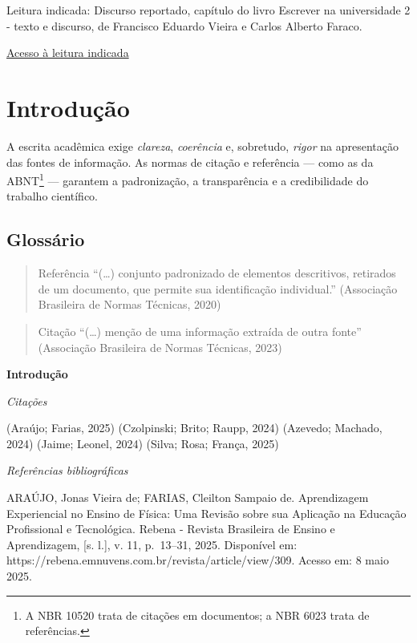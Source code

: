 \documentclass[
  letterpaper,
  DIV=11,
  numbers=noendperiod]{scrreprt}
\begin{document}
Leitura indicada: Discurso reportado, capítulo do livro Escrever na
universidade 2 - texto e discurso, de Francisco Eduardo Vieira e Carlos
Alberto Faraco.

\href{https://drive.google.com/file/d/17QvXPqtVvgArZpXv0XJhTnwTayxVkxFc/view?usp=sharing}{Acesso
à leitura indicada}

\section{Introdução}\label{introduuxe7uxe3o-3}

A escrita acadêmica exige \emph{clareza}, \emph{coerência} e, sobretudo,
\emph{rigor} na apresentação das fontes de informação. As normas de
citação e referência --- como as da ABNT\footnote{A NBR 10520 trata de
  citações em documentos; a NBR 6023 trata de referências.} --- garantem
a padronização, a transparência e a credibilidade do trabalho
científico.

\subsection{Glossário}\label{glossuxe1rio}

\begin{quote}
Referência ``(\ldots) conjunto padronizado de elementos descritivos,
retirados de um documento, que permite sua identificação individual.''
(Associação Brasileira de Normas Técnicas, 2020)
\end{quote}

\begin{quote}
Citação ``(\ldots) menção de uma informação extraída de outra fonte''
(Associação Brasileira de Normas Técnicas, 2023)
\end{quote}

\textbf{Introdução}

\emph{Citações}

(Araújo; Farias, 2025) (Czolpinski; Brito; Raupp, 2024) (Azevedo;
Machado, 2024) (Jaime; Leonel, 2024) (Silva; Rosa; França, 2025)

\emph{Referências bibliográficas}

ARAÚJO, Jonas Vieira de; FARIAS, Cleilton Sampaio de. Aprendizagem
Experiencial no Ensino de Física: Uma Revisão sobre sua Aplicação na
Educação Profissional e Tecnológica. Rebena - Revista Brasileira de
Ensino e Aprendizagem, {[}s. l.{]}, v. 11, p.~13--31, 2025. Disponível
em: https://rebena.emnuvens.com.br/revista/article/view/309. Acesso em:
8 maio 2025.
\end{document}
